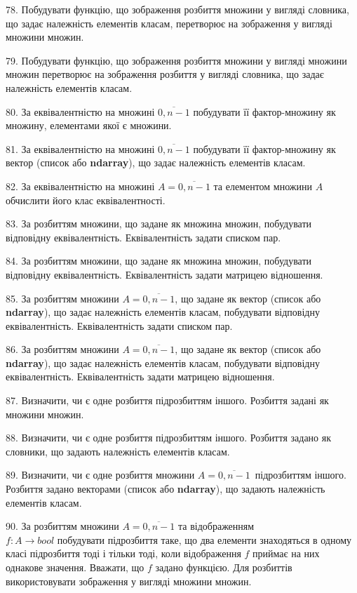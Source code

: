 \documentclass[10pt, ukrainian]{article}
\begin{document}
{\begin {Large}
78. Побудувати функцію, що зображення розбиття множини у вигляді словника, що задає належність елементів класам, перетворює на зображення у вигляді множини множин.

\newpage

79. Побудувати функцію, що зображення розбиття множини у вигляді множини множин перетворює на зображення розбиття у вигляді словника, що задає належність елементів класам.

80. За еквівалентністю на множині $\overline{0,n-1}$ побудувати її фактор-множину як множину, елементами якої є множини.

81. За еквівалентністю на множині $\overline{0,n-1}$ побудувати її фактор-множину як вектор (список або  \textbf{ndarray}), що задає належність елементів класам.

82. За еквівалентністю на множині $A=\overline{0,n-1}$ та елементом множини $A$ обчислити його клас еквівалентності.

83. За розбиттям множини, що задане як множина множин, побудувати відповідну еквівалентність. Еквівалентність задати списком пар.

84. За розбиттям множини, що задане як множина множин, побудувати відповідну еквівалентність. Еквівалентність задати матрицею відношення.

85. За розбиттям множини $A=\overline{0,n-1}$, що задане як вектор (список або  \textbf{ndarray}), що задає належність елементів класам, побудувати відповідну еквівалентність. Еквівалентність задати списком пар.

86. За розбиттям множини $A=\overline{0,n-1}$, що задане як вектор (список або  \textbf{ndarray}), що задає належність елементів класам, побудувати відповідну еквівалентність. Еквівалентність задати матрицею відношення.

87. Визначити, чи є одне розбиття підрозбиттям іншого. Розбиття задані як множини множин.

88. Визначити, чи є одне розбиття підрозбиттям іншого. Розбиття задано як словники, що задають належність елементів класам.

89. Визначити, чи є одне розбиття множини $A=\overline{0,n-1}$\ підрозбиттям іншого. Розбиття задано векторами (список або  \textbf{ndarray}), що задають належність елементів класам.

\newpage

90. За розбиттям множини $A=\overline{0,n-1}$ та відображенням\\ $f{:}A\rightarrow{bool}$  побудувати підрозбиття таке, що два елементи знаходяться в одному класі підрозбиття тоді і тільки тоді, коли відображення $f$ приймає на них однакове значення. Вважати, що $f$ задано функцією. Для розбиттів використовувати зображення у вигляді множини множин.


\end{Large}}
\end{document}
